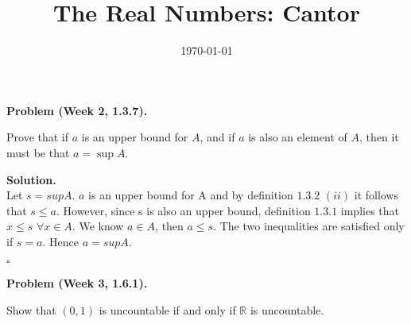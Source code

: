 \documentclass[12pt]{article}
\title{The Real Numbers: Cantor}
\date{\today}
\theoremstyle{definition}
\theoremstyle{remark}
\newenvironment{problem}[1]{
    \vspace{1em}
    \noindent
    \textbf{Problem #1.} 
}{
    \vspace{1em}
}
\newenvironment{solution}{
    \noindent
    \textbf{Solution.}\\
}{
    \quad \hfill $\square$
    \vspace{1em}
}
\begin{document}
\maketitle

\noindent 

\bigskip


\begin{problem}{(Week 2, 1.3.7)}
    Prove that if \(a\) is an upper bound for \(A\), and if \(a\) is also an element of \(A\), 
    then it must be that \(a = \sup A\).
\end{problem}

\begin{solution}
    Let $s = supA$. $a$ is an upper bound for A and by definition $1.3.2$ $(ii)$ \cite{abbott2015understanding} it follows that
    $s \leq a$. However, since s is also an upper bound, definition $1.3.1$ \cite{abbott2015understanding} implies that $x \leq s$ $\forall x \in A$. We know $a \in A$, then $a \leq s$. The two inequalities are satisfied only if $s=a$. Hence $a = supA$.

\end{solution}

\begin{problem}{(Week 3, 1.6.1)}
    Show that $(0, 1)$ is uncountable if and only if $\mathbb{R}$ is uncountable. 
\end{problem}
\end{document}
